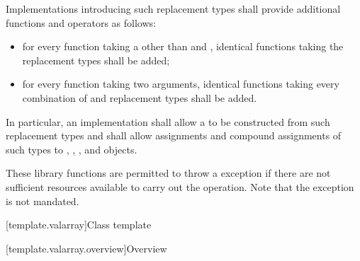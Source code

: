 \pnum
Implementations introducing such replacement types shall provide
additional functions and operators as follows:
\begin{itemize}
\item
for every function taking a
 other than
 and
,
identical functions taking the replacement types shall be added;
\item
for every function taking two
arguments, identical functions taking every combination of
and replacement types shall be added.
\end{itemize}

\pnum
In particular, an implementation shall allow a
to be constructed from such replacement types and shall allow assignments
and compound assignments of such types to
,
,
,
and
objects.

\pnum
These library functions are permitted to throw a
 exception if there are not sufficient resources available
to carry out the operation.
Note that the exception is not mandated.

[template.valarray]{Class template }

[template.valarray.overview]{Overview}

